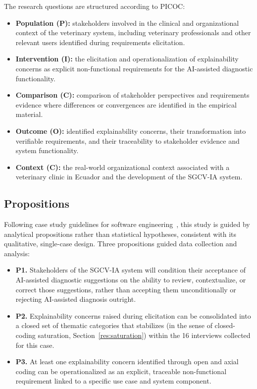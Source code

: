 \documentclass[pdflatex,sn-mathphys-num,Numbered]{sn-jnl}
\begin{document}
The research questions are structured according to PICOC:

\begin{itemize}
\item \textbf{Population (P):} stakeholders involved in the clinical and organizational context of the veterinary system, including veterinary professionals and other relevant users identified during requirements elicitation.
\item \textbf{Intervention (I):} the elicitation and operationalization of explainability concerns as explicit non-functional requirements for the AI-assisted diagnostic functionality.
\item \textbf{Comparison (C):} comparison of stakeholder perspectives and requirements evidence where differences or convergences are identified in the empirical material.
\item \textbf{Outcome (O):} identified explainability concerns, their transformation into verifiable requirements, and their traceability to stakeholder evidence and system functionality.
\item \textbf{Context (C):} the real-world organizational context associated with a veterinary clinic in Ecuador and the development of the SGCV-IA system.
\end{itemize}

\subsection{Propositions}\label{subsec1b}

Following case study guidelines for software engineering~\cite{runeson2009}, this study is guided by analytical propositions rather than statistical hypotheses, consistent with its qualitative, single-case design. Three propositions guided data collection and analysis:

\begin{itemize}
\item \textbf{P1.} Stakeholders of the SGCV-IA system will condition their acceptance of AI-assisted diagnostic suggestions on the ability to review, contextualize, or correct those suggestions, rather than accepting them unconditionally or rejecting AI-assisted diagnosis outright.
\item \textbf{P2.} Explainability concerns raised during elicitation can be consolidated into a closed set of thematic categories that stabilizes (in the sense of closed-coding saturation, Section~\ref{res:saturation}) within the 16 interviews collected for this case.
\item \textbf{P3.} At least one explainability concern identified through open and axial coding can be operationalized as an explicit, traceable non-functional requirement linked to a specific use case and system component.
\end{itemize}
\end{document}

